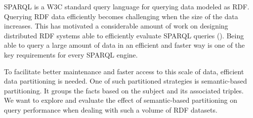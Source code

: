 \gls{SPARQL} is a \gls{W3C} standard query language for querying data modeled as \gls{RDF}.
Querying \gls{RDF} data efficiently becomes challenging when the size of the data increases.
This has motivated a considerable amount of work on designing distributed \gls{RDF} systems able to efficiently evaluate \gls{SPARQL} queries (\cite{Schatzle:2016:SRQ:2977797.2977806,sparqlgx-iswc-2016}).
Being able to query a large amount of data in an efficient and faster way is one of the key requirements for every \gls{SPARQL} engine.


To facilitate better maintenance and faster access to this scale of data, efficient data partitioning is needed.
One of such partitioned strategies is semantic-based partitioning. 
It groups the facts based on the subject and its associated triples.
We want to explore and evaluate the effect of semantic-based partitioning on query performance when dealing with such a volume of \gls{RDF} datasets.